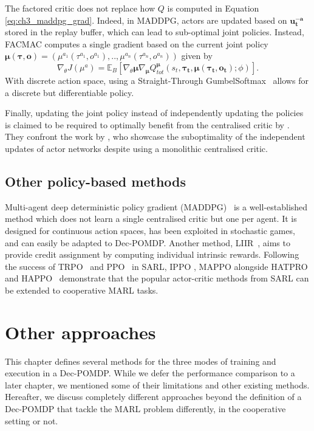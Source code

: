 The factored critic does not replace how $Q$ is computed in Equation \ref{eq:ch3_maddpg_grad}.
Indeed, in MADDPG, actors are updated based on $\mathbf{u_t^{-a}}$ stored in the replay buffer, which can lead to sub-optimal joint policies.
Instead, FACMAC computes a single gradient based on the current joint policy $\mathbf{\mu}(\mathbf{\tau}, \mathbf{o}) = (\mu^{a_1}(\tau^{a_1}, o^{a_1}), .., \mu^{a_n}(\tau^{a_n}, o^{a_n}))$ given by
\begin{equation}
\label{eq:ch3_facmac_grad}
    \nabla_\theta J(\mu^a) = \mathbb{E}_B\left[\nabla_{\theta} \mathbf{\mu} \nabla_{\mathbf{\mu}} Q_{tot}^{\mathbf{\mu}}(s_t, \mathbf{\tau_t}, \mathbf{\mu}(\mathbf{\tau_t}, \mathbf{o_t}); \phi)\right].
\end{equation}
With discrete action space, using a Straight-Through GumbelSoftmax~\citep{jang2017categorical} allows for a discrete but differentiable policy.

Finally, updating the joint policy instead of independently updating the policies is claimed to be required to optimally benefit from the centralised critic by \cite{peng2021facmac}.
They confront the work by \cite{lyu2021contrasting}, who showcase the suboptimality of the independent updates of actor networks despite using a monolithic centralised critic.

\subsection{Other policy-based methods}

Multi-agent deep deterministic policy gradient (MADDPG)~\citep{lowe2017multi} is a well-established method which does not learn a single centralised critic but one per agent.
It is designed for continuous action spaces, has been exploited in stochastic games, and can easily be adapted to Dec-POMDP.
Another method, LIIR~\citep{Du2019LIIRLearning}, aims to provide credit assignment by computing individual intrinsic rewards.
Following the success of TRPO~\citep{schulman2015trust} and PPO~\citep{schulman2017ppo} in SARL, IPPO \citep{de2020independent}, MAPPO \citep{yu2022surprising} alongside HATPRO and HAPPO~\citep{kuba2021trust} demonstrate that the popular actor-critic methods from SARL can be extended to cooperative MARL tasks.

\section{Other approaches}
\label{sec:ch3_further}
This chapter defines several methods for the three modes of training and execution in a Dec-POMDP.
While we defer the performance comparison to a later chapter, we mentioned some of their limitations and other existing methods.
Hereafter, we discuss completely different approaches beyond the definition of a Dec-POMDP that tackle the MARL problem differently, in the cooperative setting or not.

